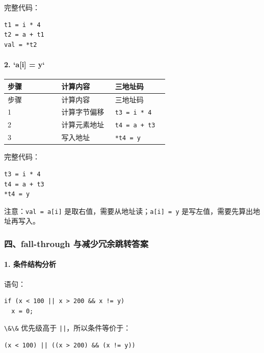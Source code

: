 \documentclass[UTF8]{ctexart}
\begin{document}
完整代码：

\begin{Verbatim}[fontsize=\small,breaklines=true]
t1 = i * 4
t2 = a + t1
val = *t2
\end{Verbatim}

\paragraph*{2. `a[i] = y`}

\begin{longtable}{|p{0.31\linewidth}|p{0.31\linewidth}|p{0.31\linewidth}|}
\hline
步骤 & 计算内容 & 三地址码 \\
\hline
\endfirsthead
步骤 & 计算内容 & 三地址码 \\
\hline
\endhead
1 & 计算字节偏移 & \texttt{t3 = i * 4} \\
\hline
2 & 计算元素地址 & \texttt{t4 = a + t3} \\
\hline
3 & 写入地址 & \texttt{*t4 = y} \\
\hline
\end{longtable}

完整代码：

\begin{Verbatim}[fontsize=\small,breaklines=true]
t3 = i * 4
t4 = a + t3
*t4 = y
\end{Verbatim}

注意：\texttt{val = a[i]} 是取右值，需要从地址读；\texttt{a[i] = y} 是写左值，需要先算出地址再写入。

\subsubsection*{四、fall-through 与减少冗余跳转答案}

\paragraph*{1. 条件结构分析}

语句：

\begin{Verbatim}[fontsize=\small,breaklines=true]
if (x < 100 || x > 200 && x != y)
  x = 0;
\end{Verbatim}

\texttt{\textbackslash{}\&\textbackslash{}\&} 优先级高于 \texttt{||}，所以条件等价于：

\begin{Verbatim}[fontsize=\small,breaklines=true]
(x < 100) || ((x > 200) && (x != y))
\end{Verbatim}
\end{document}

